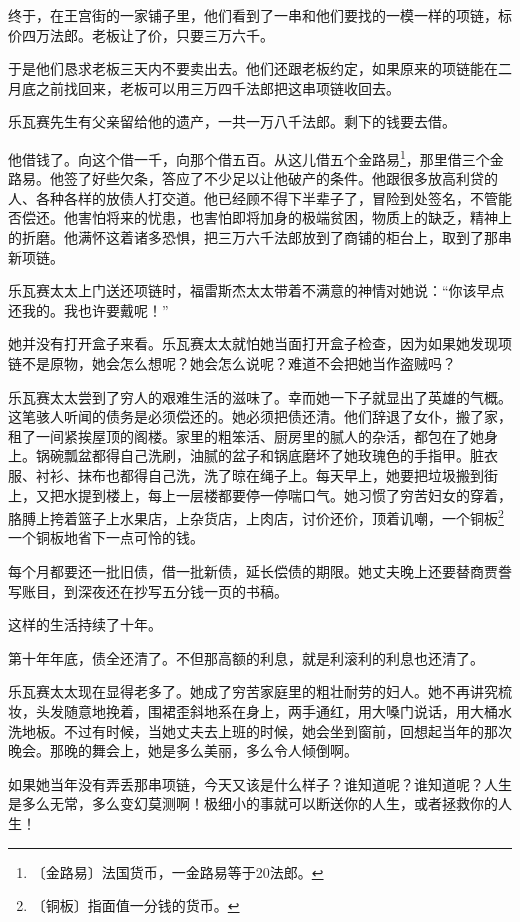 \documentclass[12pt,UTF-8,openany]{ctexbook}
\begin{document}
\begin{large}
    终于，在王宫街的一家铺子里，他们看到了一串和他们要找的一模一样的项链，标价四万法郎。老板让了价，只要三万六千。
    
    于是他们恳求老板三天内不要卖出去。他们还跟老板约定，如果原来的项链能在二月底之前找回来，老板可以用三万四千法郎把这串项链收回去。
    
    乐瓦赛先生有父亲留给他的遗产，一共一万八千法郎。剩下的钱要去借。
    
    他借钱了。向这个借一千，向那个借五百。从这儿借五个金路易\footnote{〔金路易〕法国货币，一金路易等于20法郎。}，那里借三个金路易。他签了好些欠条，答应了不少足以让他破产的条件。他跟很多放高利贷的人、各种各样的放债人打交道。他已经顾不得下半辈子了，冒险到处签名，不管能否偿还。他害怕将来的忧患，也害怕即将加身的极端贫困，物质上的缺乏，精神上的折磨。他满怀这着诸多恐惧，把三万六千法郎放到了商铺的柜台上，取到了那串新项链。
    
    乐瓦赛太太上门送还项链时，福雷斯杰太太带着不满意的神情对她说：“你该早点还我的。我也许要戴呢！”
    
    她并没有打开盒子来看。乐瓦赛太太就怕她当面打开盒子检查，因为如果她发现项链不是原物，她会怎么想呢？她会怎么说呢？难道不会把她当作盗贼吗？
    
    乐瓦赛太太尝到了穷人的艰难生活的滋味了。幸而她一下子就显出了英雄的气概。这笔骇人听闻的债务是必须偿还的。她必须把债还清。他们辞退了女仆，搬了家，租了一间紧挨屋顶的阁楼。家里的粗笨活、厨房里的腻人的杂活，都包在了她身上。锅碗瓢盆都得自己洗刷，油腻的盆子和锅底磨坏了她玫瑰色的手指甲。脏衣服、衬衫、抹布也都得自己洗，洗了晾在绳子上。每天早上，她要把垃圾搬到街上，又把水提到楼上，每上一层楼都要停一停喘口气。她习惯了穷苦妇女的穿着，胳膊上挎着篮子上水果店，上杂货店，上肉店，讨价还价，顶着讥嘲，一个铜板\footnote{〔铜板〕指面值一分钱的货币。}一个铜板地省下一点可怜的钱。
    
    每个月都要还一批旧债，借一批新债，延长偿债的期限。她丈夫晚上还要替商贾誊写账目，到深夜还在抄写五分钱一页的书稿。
    
    这样的生活持续了十年。
    
    第十年年底，债全还清了。不但那高额的利息，就是利滚利的利息也还清了。
    
    乐瓦赛太太现在显得老多了。她成了穷苦家庭里的粗壮耐劳的妇人。她不再讲究梳妆，头发随意地挽着，围裙歪斜地系在身上，两手通红，用大嗓门说话，用大桶水洗地板。不过有时候，当她丈夫去上班的时候，她会坐到窗前，回想起当年的那次晚会。那晚的舞会上，她是多么美丽，多么令人倾倒啊。
    
    如果她当年没有弄丢那串项链，今天又该是什么样子？谁知道呢？谁知道呢？人生是多么无常，多么变幻莫测啊！极细小的事就可以断送你的人生，或者拯救你的人生！
    

\end{large}
\end{document}
